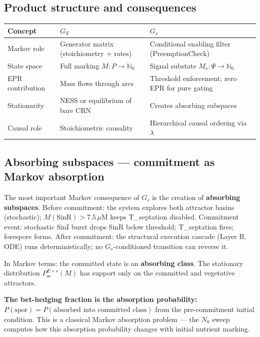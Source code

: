 \documentclass[11pt,a4paper]{article}
\begin{document}
\subsection*{Product structure and consequences}

\begin{center}
\begin{tabular}{p{3cm}p{5cm}p{5cm}}
\toprule
Concept & $G_E$ & $G_s$ \\
\midrule
Markov role & Generator matrix (stoichiometry + rates) &
  Conditional enabling filter (PreemptionCheck) \\
State space & Full marking $M: P \to \mathbb{N}_0$ &
  Signal substate $M_s: \Psi \to \mathbb{N}_0$ \\
EPR contribution & Mass flows through arcs &
  Threshold enforcement; zero EPR for pure gating \\
Stationarity & NESS or equilibrium of bare CRN &
  Creates absorbing subspaces \\
Causal role & Stoichiometric causality &
  Hierarchical causal ordering via $\lambda$ \\
\bottomrule
\end{tabular}
\end{center}

\subsection*{Absorbing subspaces — commitment as Markov absorption}

The most important Markov consequence of $G_s$ is the creation of
\textbf{absorbing subspaces}.
Before commitment: the system explores both attractor basins
(stochastic); $M(\text{SinR}) > 7.5\,\mu$M keeps T\_septation disabled.
Commitment event: stochastic SinI burst drops SinR below threshold;
T\_septation fires; forespore forms.
After commitment: the structural execution cascade (Layer B, ODE) runs
deterministically; no $G_s$-conditioned transition can reverse it.

In Markov terms: the committed state is an \textbf{absorbing class}.
The stationary distribution $P_{\mathrm{ss}}^{E \times s}(M)$ has support
only on the committed and vegetative attractors.

\textbf{The bet-hedging fraction is the absorption probability:}
$P(\mathrm{spor}) = P(\text{absorbed into committed class})$ from the
pre-commitment initial condition.
This is a classical Markov absorption problem --- the $N_0$ sweep
computes how this absorption probability changes with initial nutrient
marking.
\end{document}

